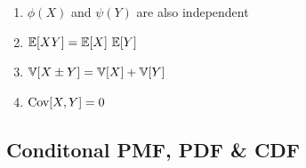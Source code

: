 \begin{multicols}{2}
\begin{enumerate}[resume*=calcrulesrv]
    \item $\phi(X)$ and $\psi(Y)$ are also independent
    \hfill \cite{statistics/book/Statistics-for-Data-Scientists/Maurits-Kaptein}

    \item $\mbbE[X Y]  = \mbbE[X]\ \mbbE[Y]$
    \hfill \cite{statistics/book/Statistics-for-Data-Scientists/Maurits-Kaptein}

    \item $\mathbb{V}[X \pm Y] = \mathbb{V}[X] + \mathbb{V}[Y]$
    \hfill \cite{statistics/book/Statistics-for-Data-Scientists/Maurits-Kaptein, mfml/book/mml/Deisenroth-Faisal-Ong}

    \item $\text{Cov}[X, Y] = 0$
    \hfill \cite{statistics/book/Statistics-for-Data-Scientists/Maurits-Kaptein, mfml/book/mml/Deisenroth-Faisal-Ong}
\end{enumerate}
\end{multicols}






\subsection{Conditonal PMF, PDF \& CDF}

